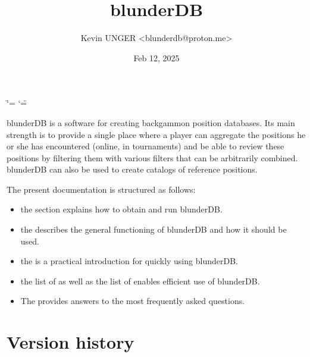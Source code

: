 \documentclass[letterpaper,10pt,english]{sphinxmanual}
\title{blunderDB}
\date{Feb 12, 2025}
\author{Kevin UNGER \textless{}blunderdb@proton.me\textgreater{}}
\begin{document}
\ifdefined\shorthandoff
  \ifnum\catcode`\=\string=\active\shorthandoff{=}\fi
  \ifnum\catcode`\"=\active{}\fi
\fi

\pagestyle{empty}
\sphinxmaketitle
\pagestyle{plain}
\sphinxtableofcontents
\pagestyle{normal}
\label{\detokenize{index::doc}}


\sphinxAtStartPar
blunderDB is a software for creating backgammon position databases. Its main strength is to provide a single place where a player can aggregate the positions he or she has encountered (online, in tournaments) and be able to review these positions by filtering them with various filters that can be arbitrarily combined. blunderDB can also be used to create catalogs of reference positions.

\sphinxAtStartPar
The present documentation is structured as follows:
\begin{itemize}
\item {} 
\sphinxAtStartPar
the  section explains how to obtain and run blunderDB.

\item {} 
\sphinxAtStartPar
the  describes the general functioning of blunderDB and how it should be used.

\item {} 
\sphinxAtStartPar
the  is a practical introduction for quickly using blunderDB.

\item {} 
\sphinxAtStartPar
the list of  as well as the list of  enables efficient use of blunderDB.

\item {} 
\sphinxAtStartPar
The  provides answers to the most frequently asked questions.

\end{itemize}


\chapter{Version history}
\label{\detokenize{index:historique-des-versions}}
\end{document}
